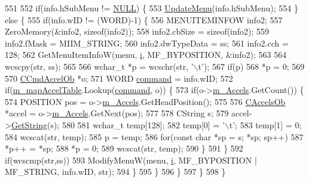 \begin{DoxyCode}
551       
552       \textcolor{keywordflow}{if}(info.hSubMenu != \mbox{\hyperlink{getopt1_8c_a070d2ce7b6bb7e5c05602aa8c308d0c4}{NULL}}) \{
553         \mbox{\hyperlink{class_c_accelerator_manager_ac854ec5263a7bab961bf63aec3938984}{UpdateMenu}}(info.hSubMenu);
554       \} \textcolor{keywordflow}{else} \{
555         \textcolor{keywordflow}{if}(info.wID != (WORD)-1) \{
556           MENUITEMINFOW info2;
557           ZeroMemory(&info2, \textcolor{keyword}{sizeof}(info2));
558           info2.cbSize = \textcolor{keyword}{sizeof}(info2);
559           info2.fMask = MIIM\_STRING;
560           info2.dwTypeData = ss;
561           info2.cch = 128;
562           GetMenuItemInfoW(menu, \mbox{\hyperlink{expr-lex_8cpp_acb559820d9ca11295b4500f179ef6392}{i}}, MF\_BYPOSITION, &info2);
563 
564           wcscpy(str, ss);
565           
566           \textcolor{keywordtype}{wchar\_t} *p = wcschr(str, \textcolor{charliteral}{'\(\backslash\)t'});
567           \textcolor{keywordflow}{if}(p)
568             *p = 0;
569           
570           \mbox{\hyperlink{class_c_cmd_accel_ob}{CCmdAccelOb}} *o;
571           WORD \mbox{\hyperlink{_commands_8cpp_a9f83d3c4b4c3bb790f90ad79865e37ab}{command}} = info.wID;
572           \textcolor{keywordflow}{if}(\mbox{\hyperlink{class_c_accelerator_manager_a16b8d3e9328bc0eeeb048630deff2768}{m\_mapAccelTable}}.Lookup(\mbox{\hyperlink{_commands_8cpp_a9f83d3c4b4c3bb790f90ad79865e37ab}{command}}, o)) \{
573             \textcolor{keywordflow}{if}(o->\mbox{\hyperlink{class_c_cmd_accel_ob_a85772f1ea9204af42b8a39a0135dc0f8}{m\_Accels}}.GetCount()) \{
574               POSITION pos = o->\mbox{\hyperlink{class_c_cmd_accel_ob_a85772f1ea9204af42b8a39a0135dc0f8}{m\_Accels}}.GetHeadPosition();
575               
576               \mbox{\hyperlink{class_c_accels_ob}{CAccelsOb}} *accel = o->\mbox{\hyperlink{class_c_cmd_accel_ob_a85772f1ea9204af42b8a39a0135dc0f8}{m\_Accels}}.GetNext(pos);
577               
578               CString s;
579               accel->\mbox{\hyperlink{class_c_accels_ob_afaf7510fa1e0707863f6bd469f190de6}{GetString}}(s);
580 
581               \textcolor{keywordtype}{wchar\_t} temp[128];
582               temp[0] = \textcolor{charliteral}{'\(\backslash\)t'};
583               temp[1] = 0;
584               wcscat(str, temp);
585               p = temp;
586               \textcolor{keywordflow}{for}(\textcolor{keyword}{const} \textcolor{keywordtype}{char} *sp = s; *sp; sp++)
587                 *p++ = *sp;
588               *p = 0;
589               wcscat(str, temp);
590             \}
591           \}
592           \textcolor{keywordflow}{if}(wcscmp(str,ss))
593             ModifyMenuW(menu, \mbox{\hyperlink{expr-lex_8cpp_acb559820d9ca11295b4500f179ef6392}{i}}, MF\_BYPOSITION | MF\_STRING, info.wID, str);
594         \}
595       \}
596     \}
597   \}
598 \}
\end{DoxyCode}
